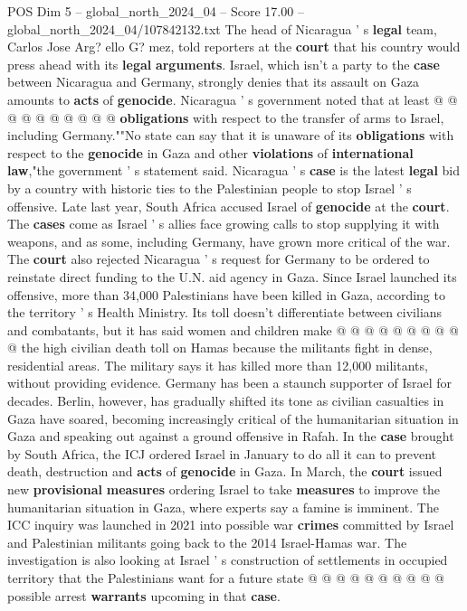 \begin{textsample}{POS Dim 5 – global\_north\_2024\_04 – Score 17.00 – global\_north\_2024\_04/107842132.txt}
The head of Nicaragua ' s \textbf{legal} team, Carlos Jose Arg? ello G? mez, told reporters at the \textbf{court} that his country would press ahead with its \textbf{legal} \textbf{arguments}.
Israel, which isn't a party to the \textbf{case} between Nicaragua and Germany, strongly denies that its assault on Gaza amounts to \textbf{acts} of \textbf{genocide}.
Nicaragua ' s government noted that at least @ @ @ @ @ @ @ @ @ @ \textbf{obligations} with respect to the transfer of arms to Israel, including Germany.""No state can say that it is unaware of its \textbf{obligations} with respect to the \textbf{genocide} in Gaza and other \textbf{violations} of \textbf{international} \textbf{law},"the government ' s statement said.
Nicaragua ' s \textbf{case} is the latest \textbf{legal} bid by a country with historic ties to the Palestinian people to stop Israel ' s offensive.
Late last year, South Africa accused Israel of \textbf{genocide} at the \textbf{court}.
The \textbf{cases} come as Israel ' s allies face growing calls to stop supplying it with weapons, and as some, including Germany, have grown more critical of the war.
The \textbf{court} also rejected Nicaragua ' s request for Germany to be ordered to reinstate direct funding to the U.N. aid agency in Gaza.
Since Israel launched its offensive, more than 34,000 Palestinians have been killed in Gaza, according to the territory ' s Health Ministry.
Its toll doesn't differentiate between civilians and combatants, but it has said women and children make @ @ @ @ @ @ @ @ @ @ the high civilian death toll on Hamas because the militants fight in dense, residential areas.
The military says it has killed more than 12,000 militants, without providing evidence.
Germany has been a staunch supporter of Israel for decades.
Berlin, however, has gradually shifted its tone as civilian casualties in Gaza have soared, becoming increasingly critical of the humanitarian situation in Gaza and speaking out against a ground offensive in Rafah.
In the \textbf{case} brought by South Africa, the ICJ ordered Israel in January to do all it can to prevent death, destruction and \textbf{acts} of \textbf{genocide} in Gaza.
In March, the \textbf{court} issued new \textbf{provisional} \textbf{measures} ordering Israel to take \textbf{measures} to improve the humanitarian situation in Gaza, where experts say a famine is imminent.
The ICC inquiry was launched in 2021 into possible war \textbf{crimes} committed by Israel and Palestinian militants going back to the 2014 Israel-Hamas war.
The investigation is also looking at Israel ' s construction of settlements in occupied territory that the Palestinians want for a future state @ @ @ @ @ @ @ @ @ @ possible arrest \textbf{warrants} upcoming in that \textbf{case}.

\end{textsample}
